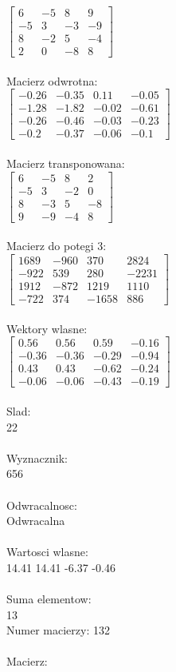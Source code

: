 \documentclass[a4paper,12pt]{article}
\begin{document}
$\begin{bmatrix} 6&-5&8&9\\-5&3&-3&-9\\8&-2&5&-4\\2&0&-8&8 \end{bmatrix}$
\\
\\
Macierz odwrotna:\\

$\begin{bmatrix} -0.26&-0.35&0.11&-0.05\\-1.28&-1.82&-0.02&-0.61\\-0.26&-0.46&-0.03&-0.23\\-0.2&-0.37&-0.06&-0.1 \end{bmatrix}$
\\
\\
Macierz transponowana:\\

$\begin{bmatrix} 6&-5&8&2\\-5&3&-2&0\\8&-3&5&-8\\9&-9&-4&8 \end{bmatrix}$
\\
\\
Macierz do potegi 3:\\

$\begin{bmatrix} 1689&-960&370&2824\\-922&539&280&-2231\\1912&-872&1219&1110\\-722&374&-1658&886 \end{bmatrix}$
\\
\\
Wektory wlasne:\\

$\begin{bmatrix} 0.56&0.56&0.59&-0.16\\-0.36&-0.36&-0.29&-0.94\\0.43&0.43&-0.62&-0.24\\-0.06&-0.06&-0.43&-0.19 \end{bmatrix}$
\\
\\
Slad:\\
22
\\
\\
Wyznacznik:\\
656
\\
\\
Odwracalnosc:\\
Odwracalna
\\
\\
Wartosci wlasne:\\
14.41 14.41 -6.37 -0.46
\\
\\
Suma elementow:\\
13
\\
\newpage
Numer macierzy:
132
\\
\\
Macierz:\\
\end{document}
